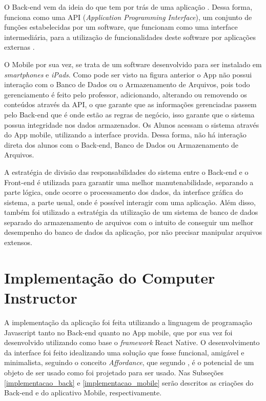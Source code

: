 O Back-end vem da ideia do que tem por trás de uma aplicação \cite{mariosouto2019}. Dessa forma, funciona como uma API (\textit{Application Programming Interface}), um conjunto de funções estabelecidas por um software, que funcionam como uma interface intermediária, para a utilização de funcionalidades deste software por aplicações externas \cite{andersonirias2019}.

O Mobile por sua vez, se trata de um software desenvolvido para ser instalado em \textit{smartphones} e \textit{iPads}. Como pode ser visto na figura anterior o App não possui interação com o Banco de Dados ou o Armazenamento de Arquivos, pois todo gerenciamento é feito pelo professor, adicionando, alterando ou removendo os conteúdos através da API, o que garante que as informações gerenciadas passem pelo Back-end que é onde estão as regras de negócio, isso garante que o sistema possua integridade nos dados armazenados.
Os Alunos acessam o sistema através do App mobile, utilizando a interface provida. Dessa forma, não há interação direta dos alunos com o Back-end, Banco de Dados ou Armazenamento de Arquivos.

A estratégia de divisão das responsabilidades do sistema entre o Back-end e o Front-end é utilizada para garantir uma melhor manutenabilidade, separando a parte lógica, onde ocorre o processamento dos dados, da interface gráfica do sistema, a parte usual, onde é possível interagir com uma aplicação. Além disso, também foi utilizado a estratégia da utilização de um sistema de banco de dados separado do armazenamento de arquivos com o intuito de conseguir um melhor desempenho do banco de dados da aplicação, por não precisar manipular arquivos extensos.


\section{Implementação do  Computer Instructor}
\label{implementacao}

A implementação da aplicação foi feita utilizando a linguagem de programação Javascript tanto no Back-end quanto no App mobile, que por sua vez foi desenvolvido utilizando como base o \textit{framework} React Native. O desenvolvimento da interface foi feito idealizando uma solução que fosse funcional, amigável e minimalista, seguindo o conceito \textit{Affordance}, que segundo ,  é o potencial de um objeto de ser usado como foi projetado para ser usado. Nas Subseções \ref{implementacao_back} e \ref{implementacao_mobile} serão descritos as criações do Back-end e do aplicativo Mobile, respectivamente. 

